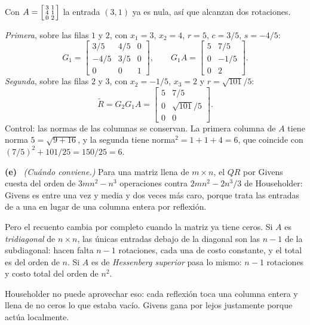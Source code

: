 \documentclass[11pt,a4paper]{article}
\newcommand{\itemsol}[1]{\par\medskip\noindent\textbf{(#1)}\ \ignorespaces}
\begin{document}
Con $A=\begin{bsmallmatrix}3&1\\4&1\\0&2\end{bsmallmatrix}$ la entrada $(3,1)$
ya es nula, así que alcanzan dos rotaciones.

\emph{Primera}, sobre las filas $1$ y $2$, con $x_1=3$, $x_2=4$, $r=5$,
$c=3/5$, $s=-4/5$:
\[
G_1=\begin{bmatrix}3/5&4/5&0\\ -4/5&3/5&0\\ 0&0&1\end{bmatrix},
\qquad
G_1A=\begin{bmatrix}5&7/5\\ 0&-1/5\\ 0&2\end{bmatrix}.
\]
\emph{Segunda}, sobre las filas $2$ y $3$, con $x_2=-1/5$, $x_3=2$ y
$r=\sqrt{101}/5$:
\[
\widetilde R=G_2G_1A=\begin{bmatrix}5&7/5\\ 0&\sqrt{101}/5\\ 0&0\end{bmatrix}.
\]
Control: las normas de las columnas se conservan. La primera columna de $A$
tiene norma $5=\sqrt{9+16}$, y la segunda tiene norma$^2=1+1+4=6$, que coincide
con $(7/5)^2+101/25=150/25=6$.

\itemsol{e} \emph{(Cuándo conviene.)} Para una matriz llena de $m\times n$, el
$QR$ por Givens cuesta del orden de $3mn^2-n^3$ operaciones contra
$2mn^2-2n^3/3$ de Householder: Givens es entre una vez y media y dos veces más
caro, porque trata las entradas de a una en lugar de una columna entera por
reflexión.

Pero el recuento cambia por completo cuando la matriz ya tiene ceros. Si $A$ es
\emph{tridiagonal} de $n\times n$, las únicas entradas debajo de la diagonal son
las $n-1$ de la subdiagonal: hacen falta $n-1$ rotaciones, cada una de costo
constante, y el total es del orden de $n$. Si $A$ es de \emph{Hessenberg
superior} pasa lo mismo: $n-1$ rotaciones y costo total del orden de $n^2$.

Householder no puede aprovechar eso: cada reflexión toca una columna entera y
llena de no ceros lo que estaba vacío. Givens gana por lejos justamente porque
actúa localmente.
\end{document}
